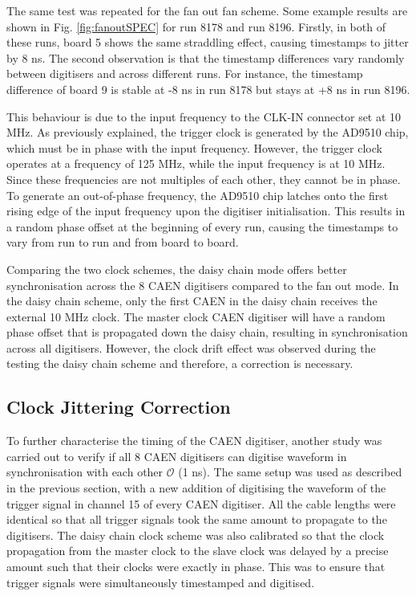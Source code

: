 The same test was repeated for the fan out fan scheme. %
Some example results are shown in Fig. \ref{fig:fanoutSPEC} for run 8178 and run 8196.
Firstly, in both of these runs, board 5 shows the same straddling effect, causing timestamps to jitter by 8 ns.
The second observation is that the timestamp differences vary randomly between digitisers and across different runs. 
For instance, the timestamp difference of board 9 is stable at -8 ns in run 8178 but stays at +8 ns in run 8196.

This behaviour is due to the input frequency to the CLK-IN connector set at 10 MHz.
As previously explained, the trigger clock is generated by the AD9510 chip, which must be in phase with the input frequency. 
However, the trigger clock operates at a frequency of 125 MHz, while the input frequency is at 10 MHz. 
Since these frequencies are not multiples of each other, they cannot be in phase.
To generate an out-of-phase frequency, the AD9510 chip latches onto the first rising edge of the input frequency upon the digitiser initialisation.
This results in a random phase offset at the beginning of every run, causing the timestamps to vary from run to run and from board to board. 

Comparing the two clock schemes, the daisy chain mode offers better synchronisation across the 8 CAEN digitisers compared to the fan out mode.
In the daisy chain scheme, only the first CAEN in the daisy chain receives the external 10 MHz clock.
The master clock CAEN digitiser will have a random phase offset that is propagated down the daisy chain, resulting in synchronisation across all digitisers.
However, the clock drift effect was observed during the testing the daisy chain scheme and therefore, a correction is necessary.

\subsection{Clock Jittering Correction}
\label{sec:jitter_correction}

To further characterise the timing of the CAEN digitiser, another study was carried out to verify if all 8 CAEN digitisers can digitise waveform in synchronisation with each other $\mathcal{O}$ (1 ns). 
The same setup was used as described in the previous section, with a new addition of digitising the waveform of the trigger signal in channel 15 of every CAEN digitiser.
All the cable lengths were identical so that all trigger signals took the same amount to propagate to the digitisers.
The daisy chain clock scheme was also calibrated so that the clock propagation from the master clock to the slave clock was delayed by a precise amount such that their clocks were exactly in phase.
This was to ensure that trigger signals were simultaneously timestamped and digitised.


